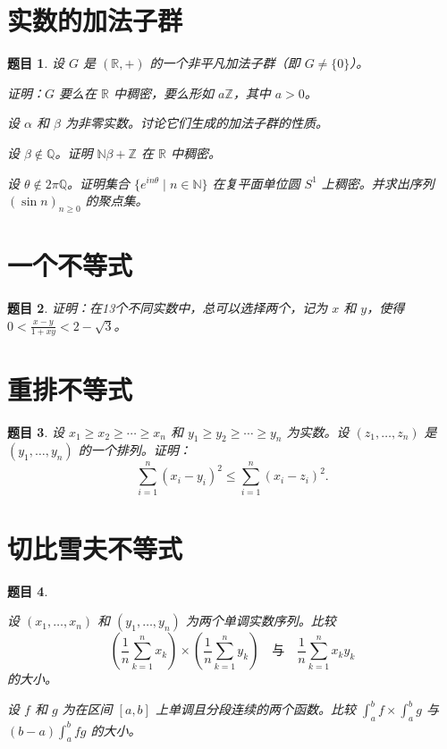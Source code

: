 \documentclass[12pt,UTF8,fontset=none]{ctexbook}
\theoremstyle{exercisestyle}
\newtheorem*{exercise}{题目}
\theoremstyle{solutionstyle}
\begin{document}
\section{实数的加法子群}
\begin{exercise}
  设 \(G\) 是 \((\mathbb{R}, +)\) 的一个非平凡加法子群（即 \(G \neq \{0\}\)）。  
  \begin{subquestions}
    \item 证明：\(G\) 要么在 \(\mathbb{R}\) 中稠密，要么形如 \(a\mathbb{Z}\)，其中 \(a > 0\)。
    \item 设 \(\alpha\) 和 \(\beta\) 为非零实数。讨论它们生成的加法子群的性质。
    \item 设 \(\beta \notin \mathbb{Q}\)。证明 \(\mathbb{N}\beta + \mathbb{Z}\) 在 \(\mathbb{R}\) 中稠密。
    \item 设 \(\theta \notin 2\pi\mathbb{Q}\)。证明集合 \(\{e^{in\theta} \mid n \in \mathbb{N}\}\) 在复平面单位圆 \(S^1\) 上稠密。并求出序列 \((\sin n)_{n\geqslant 0}\) 的聚点集。
  \end{subquestions}
\end{exercise}

\section{一个不等式}
\begin{exercise}
  证明：在13个不同实数中，总可以选择两个，记为 \(x\) 和 \(y\)，使得 \(0 < \frac{x-y}{1+xy} < 2-\sqrt{3}\)。
\end{exercise}

\section{重排不等式}
\begin{exercise}
设 \(x_1 \geqslant x_2 \geqslant \cdots \geqslant x_n\) 和 \(y_1 \geqslant y_2 \geqslant \cdots \geqslant y_n\) 为实数。设 \((z_1, \ldots, z_n)\) 是 \((y_1, \ldots, y_n)\) 的一个排列。证明：
\[
\sum_{i=1}^{n} (x_i - y_i)^2 \leqslant \sum_{i=1}^{n} (x_i - z_i)^2.
\]
\end{exercise}

\section{切比雪夫不等式}
\begin{exercise}
  \begin{subquestions}
    \item 设 \((x_1, \ldots, x_n)\) 和 \((y_1, \ldots, y_n)\) 为两个单调实数序列。比较
    \[
    \left(\frac{1}{n}\sum_{k=1}^n x_k\right) \times \left(\frac{1}{n}\sum_{k=1}^n y_k\right)
    \quad \mbox{与} \quad 
    \frac{1}{n}\sum_{k=1}^n x_k y_k
    \]
    的大小。
    \item 设 \(f\) 和 \(g\) 为在区间 \([a, b]\) 上单调且分段连续的两个函数。比较 \(\int_a^b f \times \int_a^b g\) 与 \((b-a) \int_a^b fg\) 的大小。
  \end{subquestions}
\end{exercise}
\end{document}
